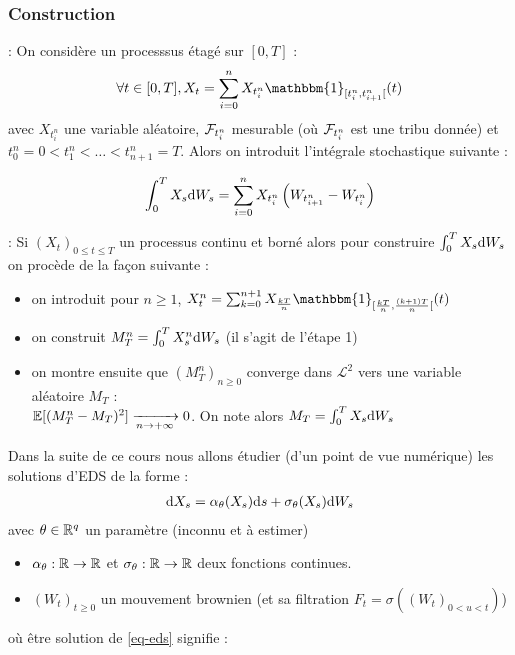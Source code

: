 \subsubsection{Construction}
 : On considère un processsus étagé sur $[0,T]$ :
\[ \forall t \in [0, T], X_t = \sum_{i=0}^{n} X_{t_i^n} \mathbbm{1}_{[t_i^n, t_{i+1}^n[}(t) \]
avec $X_{t_i^n}$ une variable aléatoire, $\mathcal{F}_{t_i^n}$ mesurable (où $\mathcal{F}_{t_i^n}$ est une tribu donnée) et $t_0^n = 0 < t_1^n < \ldots < t_{n+1}^n = T$. Alors on introduit l'intégrale stochastique suivante :

\[ \int_{0}^{T} X_s \mathrm{d} W_s = \sum_{i=0}^{n} X_{t_i^n} \left(W_{t_{i+1}^n} - W_{t_i^n} \right) \]

 : Si $(X_t)_{0\leq t \leq T}$ un processus continu et borné alors pour construire $ \int_{0}^{T} X_s \mathrm{d} W_s$ on procède de la façon suivante :
\begin{itemize}
  \item on introduit pour $n \geq 1$, $X_t^n = \sum_{k=0}^{n+1} X_{ \frac{kT}{n}} \mathbbm{1}_{[ \frac{kT}{n}, \frac{(k+1)T}{n} [}(t)$
  \item on construit $M_T^n = \int_{0}^{T} X_s^n \mathrm{d} W_s$ (il s'agit de l'étape 1)
    \item on montre ensuite que $(M_T^n)_{n\geq 0}$ converge dans $\mathcal{L}^2$ vers une variable aléatoire $M_T$ : \\
      $\mathbb{E}[(M_T^n - M_T)^2] \xrightarrow[n\to +\infty]{} 0$. On note alors $M_T = \int_{0}^{T} X_s \mathrm{d} W_s$
\end{itemize}

\vspace{0.4cm}
Dans la suite de ce cours nous allons étudier (d'un point de vue numérique) les solutions d'EDS de la forme :
\begin{equation}
  \label{eq-eds}
\begin{split}
\mathrm{d} X_s = \alpha_\theta (X_s) \mathrm{d} s + \sigma_\theta (X_s) \mathrm{d} W_s 
\end{split}
\end{equation}
avec $\theta \in \mathbb{R}^q$ un paramètre (inconnu et à estimer)
\begin{itemize}
\item $\alpha_\theta : \mathbb{R} \to \mathbb{R}$ et $\sigma_\theta : \mathbb{R} \to \mathbb{R}$ deux fonctions continues.
\item $(W_t)_{t\geq 0}$ un mouvement brownien (et sa filtration $F_t = \sigma((W_t)_{0 < u < t})$)
\end{itemize}
où être solution de \eqref{eq-eds} signifie :

